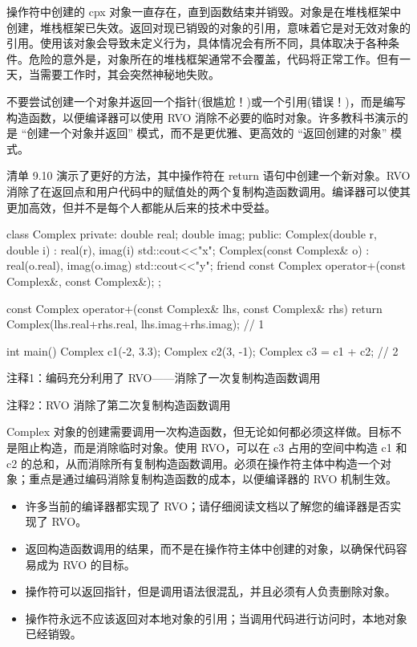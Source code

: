 操作符中创建的 cpx 对象一直存在，直到函数结束并销毁。对象是在堆栈框架中创建，堆栈框架已失效。返回对现已销毁的对象的引用，意味着它是对无效对象的引用。使用该对象会导致未定义行为，具体情况会有所不同，具体取决于各种条件。危险的意外是，对象所在的堆栈框架通常不会覆盖，代码将正常工作。但有一天，当需要工作时，其会突然神秘地失败。


不要尝试创建一个对象并返回一个指针(很尴尬！)或一个引用(错误！)，而是编写构造函数，以便编译器可以使用 RVO 消除不必要的临时对象。许多教科书演示的是 “创建一个对象并返回” 模式，而不是更优雅、更高效的 “返回创建的对象” 模式。

清单 9.10 演示了更好的方法，其中操作符在 return 语句中创建一个新对象。RVO 消除了在返回点和用户代码中的赋值处的两个复制构造函数调用。编译器可以使其更加高效，但并不是每个人都能从后来的技术中受益。


\begin{cpp}
class Complex {
private:
  double real;
  double imag;
public:
  Complex(double r, double i) : real(r), imag(i) {std::cout<<"x\n";}
  Complex(const Complex& o) : real(o.real), imag(o.imag)
    { std::cout<<"y\n"; }
  friend const Complex operator+(const Complex&, const Complex&);
};

const Complex operator+(const Complex& lhs, const Complex& rhs) {
  return Complex(lhs.real+rhs.real, lhs.imag+rhs.imag); // 1
}

int main() {
  Complex c1(-2, 3.3);
  Complex c2(3, -1);
  Complex c3 = c1 + c2; // 2
}
\end{cpp}

{\footnotesize
注释1：编码充分利用了 RVO——消除了一次复制构造函数调用

注释2：RVO 消除了第二次复制构造函数调用
}

Complex 对象的创建需要调用一次构造函数，但无论如何都必须这样做。目标不是阻止构造，而是消除临时对象。使用 RVO，可以在 c3 占用的空间中构造 c1 和 c2 的总和，从而消除所有复制构造函数调用。必须在操作符主体中构造一个对象；重点是通过编码消除复制构造函数的成本，以便编译器的 RVO 机制生效。


\begin{itemize}
\item
许多当前的编译器都实现了 RVO；请仔细阅读文档以了解您的编译器是否实现了 RVO。

\item
返回构造函数调用的结果，而不是在操作符主体中创建的对象，以确保代码容易成为 RVO 的目标。

\item
操作符可以返回指针，但是调用语法很混乱，并且必须有人负责删除对象。

\item
操作符永远不应该返回对本地对象的引用；当调用代码进行访问时，本地对象已经销毁。
\end{itemize}










